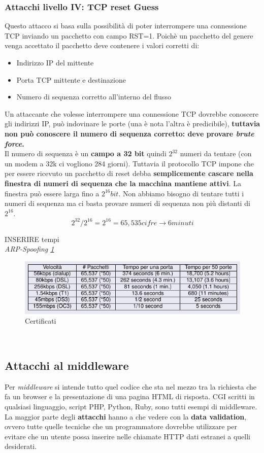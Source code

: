 \documentclass[12pt]{article}
\begin{document}
			\subsubsection{Attacchi livello IV: TCP reset Guess}
				Questo attacco si basa sulla possibilità di poter interrompere una connessione TCP inviando un pacchetto con campo RST=1. Poichè un pacchetto del genere venga accettato il pacchetto deve contenere i valori corretti di:
				\begin{itemize}
					\item Indirizzo IP del mittente
					\item Porta TCP mittente e destinazione
					\item Numero di sequenza corretto all'interno del flusso
				\end{itemize}
				Un attaccante che volesse interrompere una connessione TCP dovrebbe conoscere gli indirizzi IP, può indovinare le porte (una è nota l'altra è predicibile), \textbf{tuttavia non può conoscere il numero di sequenza corretto: deve provare \textit{brute force}.}\\
				Il numero di sequenza è un \textbf{campo a 32 bit} quindi $2^{32}$ numeri da tentare (con un modem a 32k ci vogliono 284 giorni). Tuttavia il protocollo TCP impone che per essere ricevuto un pacchetto di reset debba \textbf{semplicemente cascare nella finestra di numeri di sequenza che la macchina mantiene attivi}. La finestra può essere larga fino a $2^{16} bit$. Non abbiamo bisogno di tentare tutti i numeri di sequenza ma ci basta provare numeri di sequenza non più distanti di $2^{16}$.
				$$2^{32}/2^{16} = 2^{16} = 65,535 cifre \rightarrow 6 minuti$$
				
				INSERIRE tempi\\
				
				\textit{ARP-Spoofing \ref{fig:29}}\\
				\begin{figure}[h!]
					\centering
					\includegraphics[scale=0.60]{img/tempi.PNG}
					\caption{Certificati \label{fig:29}}
				\end{figure}\\
				
		\subsection{Attacchi al middleware}
			Per \textit{middleware} si intende tutto quel codice che sta nel mezzo tra la richiesta che fa un browser e la presentazione di una pagina HTML di risposta. CGI scritti in qualsiasi linguaggio, script PHP, Python, Ruby, sono tutti esempi di middleware.\\
			La maggior parte degli \textbf{attacchi} hanno a che vedere con la \textbf{data validation}, ovvero tutte quelle tecniche che un programmatore dovrebbe utilizzare per evitare che un utente possa inserire nelle chiamate HTTP dati estranei a quelli desiderati. 
\end{document}
